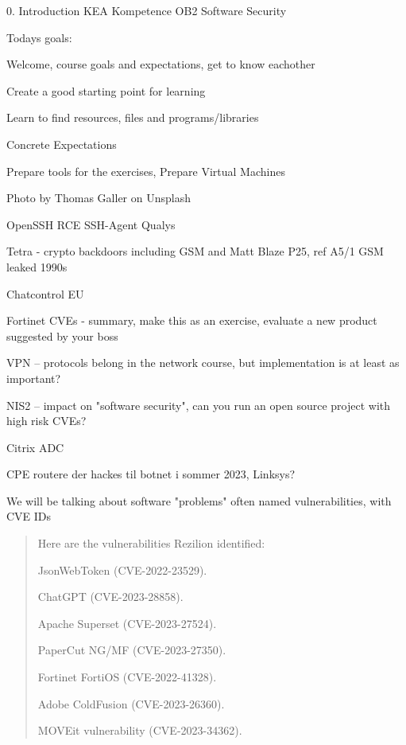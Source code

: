 \documentclass[Screen16to9,17pt]{foils}
\begin{document}
\mytitlepage
{0. Introduction}
{KEA Kompetence OB2 Software Security}

\hlkprofiluk



Todays goals:
\begin{list2}
\item Welcome, course goals and expectations, get to know eachother
\item Create a good starting point for learning
\item Learn to find resources, files and programs/libraries
\item Concrete Expectations
\item Prepare tools for the exercises, Prepare Virtual Machines
\end{list2}

  Photo by Thomas Galler on Unsplash


\begin{list2}
\item OpenSSH RCE SSH-Agent Qualys
\item Tetra - crypto backdoors including GSM and Matt Blaze P25, ref A5/1 GSM leaked 1990s
\item Chatcontrol EU
\item Fortinet CVEs - summary, make this as an exercise, evaluate a new product suggested by your boss
\item VPN -- protocols belong in the network course, but implementation is at least as important?
\item NIS2 -- impact on "software security", can you run an open source project with high risk CVEs?
\item Citrix ADC
\item CPE routere der hackes til botnet i sommer 2023, Linksys?
\end{list2}


We will be talking about software "problems" often named vulnerabilities, with CVE IDs
\begin{quote}
\begin{list2}
\item Here are the vulnerabilities Rezilion identified:
\item JsonWebToken (CVE-2022-23529).
\item ChatGPT (CVE-2023-28858).
\item Apache Superset (CVE-2023-27524).
\item PaperCut NG/MF (CVE-2023-27350).
\item Fortinet FortiOS (CVE-2022-41328).
\item Adobe ColdFusion (CVE-2023-26360).
\item MOVEit vulnerability (CVE-2023-34362).
\end{list2}
\end{quote}
\end{document}

